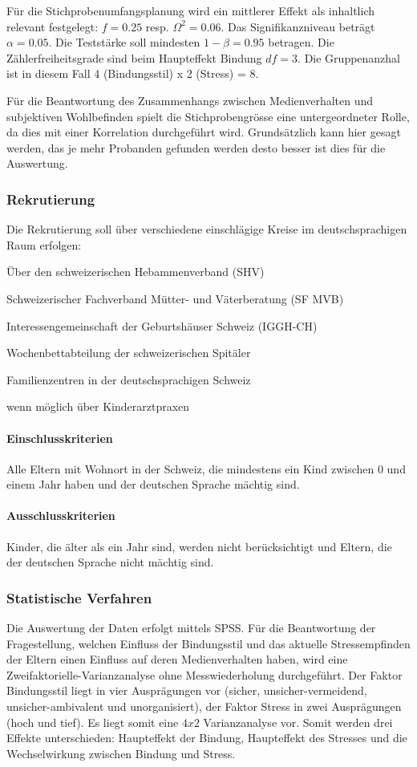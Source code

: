 Für die Stichprobenumfangsplanung wird ein mittlerer Effekt als inhaltlich relevant festgelegt: $f = 0.25$ resp. $\Omega^2 = 0.06$. Das Signifikanzniveau beträgt $\alpha=0.05$. Die Teststärke soll mindesten $1-\beta=0.95$ betragen. Die Zählerfreiheitsgrade sind beim Haupteffekt Bindung $df = 3$. Die Gruppenanzhal ist in diesem Fall 4 (Bindungsstil) x 2 (Stress) = 8.

Für die Beantwortung des Zusammenhangs zwischen Medienverhalten und subjektiven Wohlbefinden spielt die Stichprobengrösse eine untergeordneter Rolle, da dies mit einer Korrelation durchgeführt wird. Grundsätzlich kann hier gesagt werden, das je mehr Probanden gefunden werden desto besser ist dies für die Auswertung.

\subsubsection{Rekrutierung}
Die Rekrutierung soll über verschiedene einschlägige Kreise im deutschsprachigen Raum erfolgen: 
\begin{seriate}
    \item Über den schweizerischen Hebammenverband (SHV)
    \item Schweizerischer Fachverband Mütter- und Väterberatung (SF MVB)
    \item Interessengemeinschaft der Geburtshäuser Schweiz (IGGH-CH)
    \item Wochenbettabteilung der schweizerischen Spitäler
    \item Familienzentren in der deutschsprachigen Schweiz
    \item wenn möglich über Kinderarztpraxen
\end{seriate}
\paragraph{Einschlusskriterien}
Alle Eltern mit Wohnort in der Schweiz, die mindestens ein Kind zwischen 0 und einem Jahr haben und der deutschen Sprache mächtig sind.
\paragraph{Ausschlusskriterien}
Kinder, die älter als ein Jahr sind, werden nicht berücksichtigt und Eltern, die der deutschen Sprache nicht mächtig sind.
\subsubsection{Statistische Verfahren}
Die Auswertung der Daten erfolgt mittels SPSS. 
Für die Beantwortung der Fragestellung, welchen Einfluss der Bindungsstil und das aktuelle Stressempfinden der Eltern einen Einfluss auf deren Medienverhalten haben, wird eine Zweifaktorielle-Varianzanalyse ohne Messwiederholung durchgeführt. Der Faktor Bindungsstil liegt in vier Ausprägungen vor (sicher, unsicher-vermeidend, unsicher-ambivalent und unorganisiert), der Faktor Stress in zwei Ausprägungen (hoch und tief). Es liegt somit eine $4 x 2$ Varianzanalyse vor. Somit werden drei Effekte unterschieden: Haupteffekt der Bindung, Haupteffekt des Stresses und die Wechselwirkung zwischen Bindung und Stress. 


